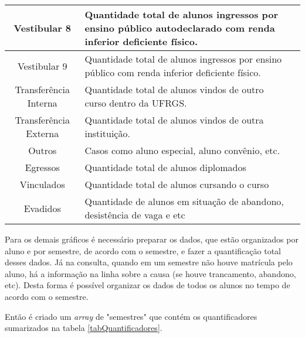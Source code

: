 \documentclass[cic,tc]{iiufrgs}
\begin{document}
\begin{longtable}[c]{|c|p{10cm}|p{2cm}|}
        Vestibular 8 &   
        Quantidade total de alunos ingressos por ensino público autodeclarado com renda inferior deficiente físico. \\ \hline
        
        Vestibular 9 &   
        Quantidade total de alunos ingressos por ensino público com renda inferior deficiente físico. \\ \hline 
        
        Transferência Interna &
        Quantidade total de alunos vindos de outro curso dentro da UFRGS. \\ \hline
        
        Transferência Externa &
        Quantidade total de alunos vindos de outra instituição. \\ \hline
        
        Outros &
        Casos como aluno especial, aluno convênio, etc. \\ \hline
        
        Egressos &
        Quantidade total de alunos diplomados \\ \hline
        
        Vinculados &
        Quantidade total de alunos cursando o curso \\ \hline
        
        Evadidos &
        Quantidade de alunos em situação de abandono, desistência de vaga e etc \\ \hline
        
\end{longtable}

   Para os demais gráficos é necessário preparar os dados, que estão organizados por aluno e por semestre, de acordo com o semestre, e fazer a quantificação total desses dados. Já na consulta, quando em um semestre não houve matrícula pelo aluno, há a informação na linha sobre a causa (se houve trancamento, abandono, etc). Desta forma é possível organizar os dados de todos os alunos no tempo de acordo com o semestre.
   
   Então é criado um \textit{array} de "semestres" que contém os quantificadores sumarizados na tabela \ref{tabQuantificadores}.
   
\end{document}
